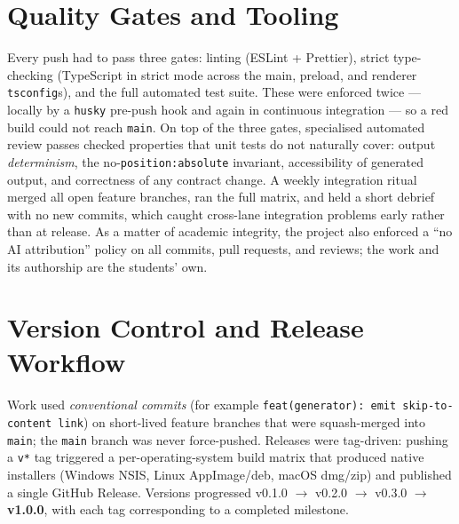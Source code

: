 \section{Quality Gates and Tooling}
Every push had to pass three gates: linting (ESLint + Prettier), strict
type-checking (TypeScript in strict mode across the main, preload, and renderer
\texttt{tsconfig}s), and the full automated test suite. These were enforced twice
--- locally by a \texttt{husky} pre-push hook and again in continuous integration
--- so a red build could not reach \texttt{main}. On top of the three gates,
specialised automated review passes checked properties that unit tests do not
naturally cover: output \emph{determinism}, the no-\texttt{position:absolute}
invariant, accessibility of generated output, and correctness of any contract
change. A weekly integration ritual merged all open feature branches, ran the full
matrix, and held a short debrief with no new commits, which caught cross-lane
integration problems early rather than at release. As a matter of academic
integrity, the project also enforced a ``no AI attribution'' policy on all commits,
pull requests, and reviews; the work and its authorship are the students' own.

\section{Version Control and Release Workflow}
Work used \emph{conventional commits} (for example
\texttt{feat(generator): emit skip-to-content link}) on short-lived feature
branches that were squash-merged into \texttt{main}; the \texttt{main} branch was
never force-pushed. Releases were tag-driven: pushing a \texttt{v*} tag triggered a
per-operating-system build matrix that produced native installers (Windows NSIS,
Linux AppImage/deb, macOS dmg/zip) and published a single GitHub Release. Versions
progressed v0.1.0 $\rightarrow$ v0.2.0 $\rightarrow$ v0.3.0 $\rightarrow$
\textbf{v1.0.0}, with each tag corresponding to a completed milestone.

